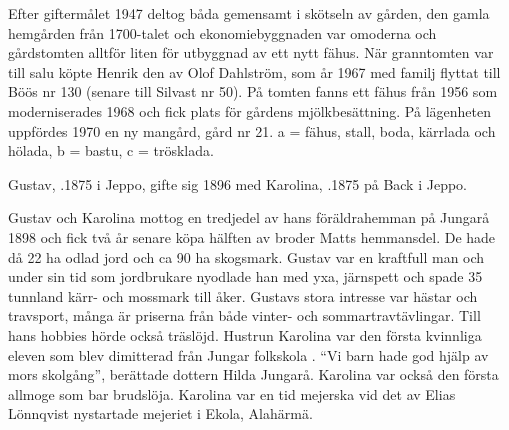 Efter giftermålet 1947 deltog båda gemensamt i skötseln av gården, den gamla hemgården från 1700-talet och ekonomiebyggnaden var omoderna och gårdstomten alltför liten för utbyggnad av ett nytt fähus. När granntomten var till salu köpte Henrik den av Olof Dahlström, som år 1967 med familj flyttat till Böös nr 130 (senare till Silvast nr 50). På tomten fanns ett fähus från 1956 som moderniserades 1968 och fick plats för gårdens mjölkbesättning. På lägenheten uppfördes 1970 en ny mangård, gård nr 21. a = fähus, stall, boda, kärrlada och hölada, b = bastu, c = trösklada.


%
Gustav, .1875 i Jeppo, gifte sig 1896 med Karolina, .1875 på Back i Jeppo.
\begin{jhchildren}
  \item {}
  \item {}
  \item {}
  \item {}
  \item {}
  \item {}
  \item {}
  \item {}
  \item {}
  \item {}
  \item {}
\end{jhchildren}
Gustav och Karolina mottog en tredjedel av hans föräldrahemman 	på Jungarå 1898 och fick två år senare köpa hälften av broder Matts hemmansdel. De hade då 22 ha odlad jord och ca 90 ha skogsmark. Gustav var en kraftfull man och under sin tid som jordbrukare nyodlade han med yxa, järnspett och spade 35 tunnland kärr- och mossmark till åker. Gustavs stora intresse var hästar och travsport, många är priserna från både vinter- och sommartravtävlingar. Till hans hobbies hörde också träslöjd. Hustrun Karolina var den första kvinnliga eleven som blev dimitterad från Jungar folkskola . ``Vi barn 	hade god hjälp av mors skolgång'', berättade dottern Hilda Jungarå. Karolina var också den första allmoge som bar brudslöja. Karolina var en tid mejerska vid det av Elias Lönnqvist nystartade mejeriet i Ekola, Alahärmä.

